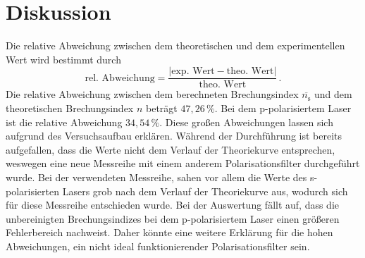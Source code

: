 \section{Diskussion}
\label{sec:Diskussion}
Die relative Abweichung zwischen dem theoretischen und dem experimentellen Wert wird bestimmt durch
$$\text{rel. Abweichung} = \frac{|\text{exp. Wert} - \text{theo. Wert}|}{\text{theo. Wert}}\,.$$
Die relative Abweichung zwischen dem berechneten Brechungsindex $\overline{n_{\text{s}}}$ und dem theoretischen Brechungsindex $n$
beträgt $47,26\,\%$. Bei dem p-polarisiertem Laser ist die relative Abweichung $34,54\,\%$. Diese großen Abweichungen lassen sich 
aufgrund des Versuchsaufbau erklären. Während der Durchführung ist bereits aufgefallen, dass die Werte nicht dem Verlauf der Theoriekurve
entsprechen, weswegen eine neue Messreihe mit einem anderem Polarisationsfilter durchgeführt wurde. Bei der verwendeten Messreihe, sahen vor allem die Werte des s-polarisierten 
Lasers grob nach dem Verlauf der Theoriekurve aus, wodurch sich für diese Messreihe entschieden wurde. Bei der Auswertung fällt auf, dass die unbereinigten Brechungsindizes bei dem 
p-polarisiertem Laser einen größeren Fehlerbereich nachweist. Daher könnte eine weitere Erklärung für die hohen Abweichungen, ein nicht ideal funktionierender
Polarisationsfilter sein. 
